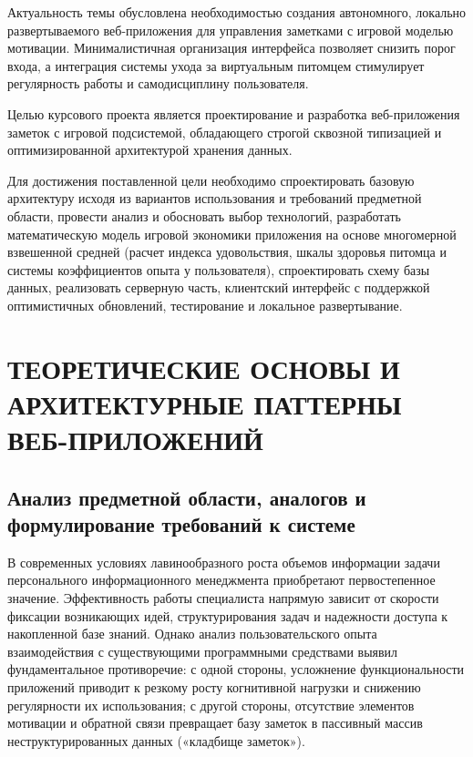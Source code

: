 \documentclass[a4paper,14pt]{extreport}
\begin{document}
Актуальность темы обусловлена необходимостью создания автономного, локально развертываемого веб-приложения для управления заметками с игровой моделью мотивации. Минималистичная организация интерфейса позволяет снизить порог входа, а интеграция системы ухода за виртуальным питомцем стимулирует регулярность работы и самодисциплину пользователя.

Целью курсового проекта является проектирование и разработка веб-приложения заметок с игровой подсистемой, обладающего строгой сквозной типизацией и оптимизированной архитектурой хранения данных.

Для достижения поставленной цели необходимо спроектировать базовую архитектуру исходя из вариантов использования и требований предметной области, провести анализ и обосновать выбор технологий, разработать математическую модель игровой экономики приложения на основе многомерной взвешенной средней (расчет индекса удовольствия, шкалы здоровья питомца и системы коэффициентов опыта у пользователя), спроектировать схему базы данных, реализовать серверную часть, клиентский интерфейс с поддержкой оптимистичных обновлений, тестирование и локальное развертывание.

\newpage

\chapter{ТЕОРЕТИЧЕСКИЕ ОСНОВЫ И АРХИТЕКТУРНЫЕ ПАТТЕРНЫ ВЕБ-ПРИЛОЖЕНИЙ}

\section{Анализ предметной области, аналогов и формулирование требований к системе}

В современных условиях лавинообразного роста объемов информации задачи персонального информационного менеджмента приобретают первостепенное значение. Эффективность работы специалиста напрямую зависит от скорости фиксации возникающих идей, структурирования задач и надежности доступа к накопленной базе знаний. Однако анализ пользовательского опыта взаимодействия с существующими программными средствами выявил фундаментальное противоречие: с одной стороны, усложнение функциональности приложений приводит к резкому росту когнитивной нагрузки и снижению регулярности их использования; с другой стороны, отсутствие элементов мотивации и обратной связи превращает базу заметок в пассивный массив неструктурированных данных («кладбище заметок»).
\end{document}
